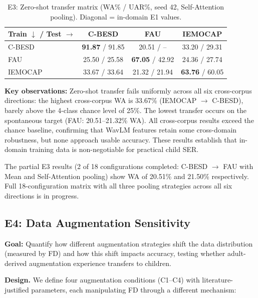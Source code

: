 \documentclass[11pt,a4paper]{article}
\begin{document}
\begin{table}[t]
\centering
\caption{E3: Zero-shot transfer matrix (WA\% / UAR\%, seed 42, Self-Attention pooling). Diagonal = in-domain E1 values.}
\label{tab:e3}
\begin{tabular}{lccc}
\toprule
\textbf{Train $\downarrow$ / Test $\rightarrow$} & \textbf{C-BESD} & \textbf{FAU} & \textbf{IEMOCAP} \\
\midrule
C-BESD   & \textbf{91.87} / 91.85 & 20.51 / -- & 33.20 / 29.31 \\
FAU      & 25.50 / 25.58 & \textbf{67.05} / 42.92 & 24.36 / 27.74 \\
IEMOCAP  & 33.67 / 33.64 & 21.32 / 21.94 & \textbf{63.76} / 60.05 \\
\bottomrule
\end{tabular}
\end{table}

\noindent\textbf{Key observations:} Zero-shot transfer fails uniformly across
all six cross-corpus directions: the highest cross-corpus WA is 33.67\%
(IEMOCAP $\rightarrow$ C-BESD), barely above the 4-class chance level of 25\%.
The lowest transfer occurs on the spontaneous target (FAU: 20.51--21.32\% WA).
All cross-corpus results exceed the chance baseline, confirming that WavLM
features retain some cross-domain robustness, but none approach usable accuracy.
These results establish that in-domain training data is non-negotiable for
practical child SER.

The partial E3 results (2 of 18 configurations completed: C-BESD $\rightarrow$
FAU with Mean and Self-Attention pooling) show WA of 20.51\% and 21.50\%
respectively. Full 18-configuration matrix with all three pooling strategies
across all six directions is in progress.

\subsection{E4: Data Augmentation Sensitivity}
\label{ssec:e4}

\textbf{Goal:} Quantify how different augmentation strategies shift the data
distribution (measured by FD) and how this shift impacts accuracy, testing
whether adult-derived augmentation experience transfers to children.

\textbf{Design.} We define four augmentation conditions (C1--C4) with
literature-justified parameters, each manipulating FD through a different
mechanism:
\end{document}
